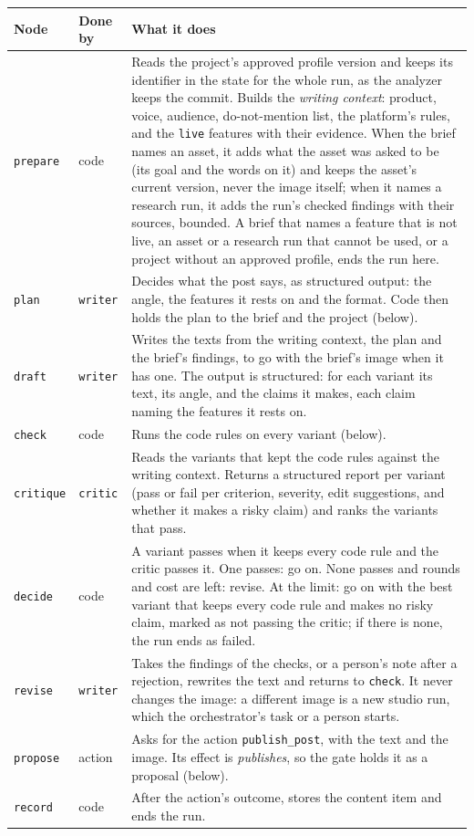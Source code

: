 \documentclass[11pt,a4paper]{article}
\begin{document}
\begin{longtable}{@{}p{2.3cm}p{3.2cm}p{9.8cm}@{}}
\toprule
\textbf{Node} & \textbf{Done by} & \textbf{What it does}\\
\midrule
\endhead
\texttt{prepare} & code & Reads the project's approved profile version and keeps its identifier in the state for the whole run, as the analyzer keeps the commit. Builds the \emph{writing context}: product, voice, audience, do-not-mention list, the platform's rules, and the \texttt{live} features with their evidence. When the brief names an asset, it adds what the asset was asked to be (its goal and the words on it) and keeps the asset's current version, never the image itself; when it names a research run, it adds the run's checked findings with their sources, bounded. A brief that names a feature that is not live, an asset or a research run that cannot be used, or a project without an approved profile, ends the run here.\\
\texttt{plan} & \texttt{writer} & Decides what the post says, as structured output: the angle, the features it rests on and the format. Code then holds the plan to the brief and the project (below).\\
\texttt{draft} & \texttt{writer} & Writes the texts from the writing context, the plan and the brief's findings, to go with the brief's image when it has one. The output is structured: for each variant its text, its angle, and the claims it makes, each claim naming the features it rests on.\\
\texttt{check} & code & Runs the code rules on every variant (below).\\
\texttt{critique} & \texttt{critic} & Reads the variants that kept the code rules against the writing context. Returns a structured report per variant (pass or fail per criterion, severity, edit suggestions, and whether it makes a risky claim) and ranks the variants that pass.\\
\texttt{decide} & code & A variant passes when it keeps every code rule and the critic passes it. One passes: go on. None passes and rounds and cost are left: revise. At the limit: go on with the best variant that keeps every code rule and makes no risky claim, marked as not passing the critic; if there is none, the run ends as failed.\\
\texttt{revise} & \texttt{writer} & Takes the findings of the checks, or a person's note after a rejection, rewrites the text and returns to \texttt{check}. It never changes the image: a different image is a new studio run, which the orchestrator's task or a person starts.\\
\texttt{propose} & action & Asks for the action \texttt{publish\_post}, with the text and the image. Its effect is \emph{publishes}, so the gate holds it as a proposal (below).\\
\texttt{record} & code & After the action's outcome, stores the content item and ends the run.\\
\bottomrule
\end{longtable}
\end{document}
